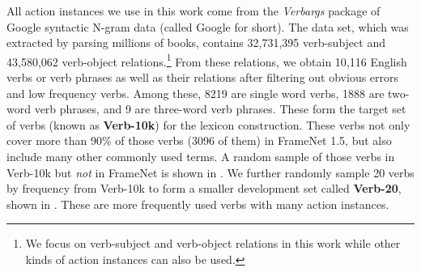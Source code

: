 All action instances we use in this work come
from the {\em Verbargs} package of Google syntactic N-gram
data\cite{goldberg2013,googlengram} (called Google for short).
The data set, which was extracted by parsing millions of books,
contains 32,731,395 verb-subject and 
43,580,062 verb-object relations.\footnote{We focus on verb-subject and
verb-object relations in this work while
other kinds of action instances can also be used.}
From these relations, we obtain 10,116 English verbs or verb phrases as well as
their relations after filtering out obvious errors and low frequency verbs.
Among these, 8219 are single word verbs, 1888 are two-word verb phrases, and
9 are three-word verb phrases.
These form the target set of verbs (known as {\bf Verb-10k}) for 
the lexicon construction.  These verbs not only cover more than 
90\% of those verbs (3096 of them) in FrameNet 1.5,
but also include many other commonly used terms. 
A random sample of those verbs in Verb-10k but {\em not} in
FrameNet is shown in . 
We further randomly sample 20 verbs
by frequency from Verb-10k to form a smaller development set called 
{\bf Verb-20},
shown in . These are more frequently 
used verbs with many action instances.

